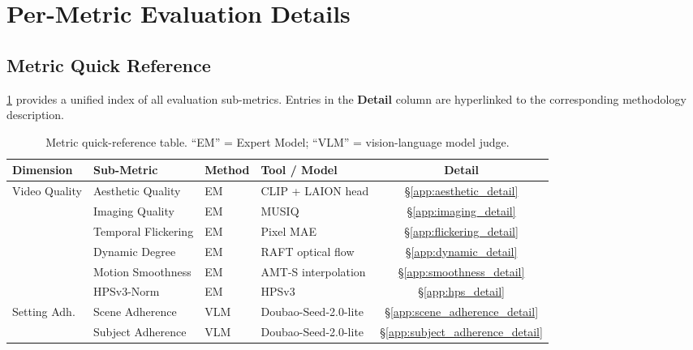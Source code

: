 
\section{Per-Metric Evaluation Details}
\label{app:metric_details}

\subsection{Metric Quick Reference}
\label{app:metric_quickref}

\cref{tab:metric_quickref} provides a unified index of all \numsubmetric evaluation sub-metrics. Entries in the \textbf{Detail} column are hyperlinked to the corresponding methodology description.

\begin{table}[H]
\caption[Metric quick-reference]{Metric quick-reference table. ``EM'' = Expert Model; ``VLM'' = vision-language model judge.}
\vspace{+1mm}
\label{tab:metric_quickref}
\centering
\renewcommand{\arraystretch}{1.15}
\scriptsize
\setlength{\tabcolsep}{3pt}
\begin{tabular}{@{}l l l l c@{}}
\toprule
\textbf{Dimension} & \textbf{Sub-Metric} & \textbf{Method} & \textbf{Tool / Model} & \textbf{Detail} \\
\midrule
\multirow{6}{*}{Video Quality}
  & Aesthetic Quality    & EM  & CLIP + LAION head     & \hyperref[app:aesthetic_detail]{\S\ref*{app:aesthetic_detail}} \\
  & Imaging Quality      & EM  & MUSIQ                 & \hyperref[app:imaging_detail]{\S\ref*{app:imaging_detail}} \\
  & Temporal Flickering  & EM  & Pixel MAE             & \hyperref[app:flickering_detail]{\S\ref*{app:flickering_detail}} \\
  & Dynamic Degree       & EM  & RAFT optical flow     & \hyperref[app:dynamic_detail]{\S\ref*{app:dynamic_detail}} \\
  & Motion Smoothness    & EM  & AMT-S interpolation   & \hyperref[app:smoothness_detail]{\S\ref*{app:smoothness_detail}} \\
  & HPSv3-Norm           & EM  & HPSv3                 & \hyperref[app:hps_detail]{\S\ref*{app:hps_detail}} \\
\midrule
\multirow{2}{*}{Setting Adh.}
  & Scene Adherence      & VLM & Doubao-Seed-2.0-lite  & \hyperref[app:scene_adherence_detail]{\S\ref*{app:scene_adherence_detail}} \\
  & Subject Adherence    & VLM & Doubao-Seed-2.0-lite  & \hyperref[app:subject_adherence_detail]{\S\ref*{app:subject_adherence_detail}} \\

\end{tabular}
\end{table}
